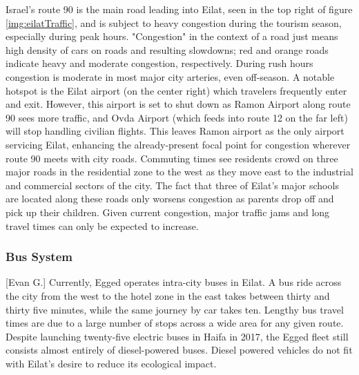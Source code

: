 \documentclass[12pt]{article}                       %
\begin{document}
Israel's route 90 is the main road leading into Eilat, seen in the top right of figure \ref{img:eilatTraffic}, and is subject to heavy congestion during the tourism season, especially during peak hours. "Congestion" in the context of a road just means high density of cars on roads and resulting slowdowns; red and orange roads indicate heavy and moderate congestion, respectively. During rush hours congestion is moderate in most major city arteries, even off-season. A notable hotspot is the Eilat airport (on the center right) which travelers frequently enter and exit. However, this airport is set to shut down as Ramon Airport along route 90 sees more traffic, and Ovda Airport (which feeds into route 12 on the far left) will stop handling civilian flights. This leaves Ramon airport as the only airport servicing Eilat, enhancing the already-present focal point for congestion wherever route 90 meets with city roads. Commuting times see residents crowd on three major roads in the residential zone to the west as they move east to the industrial and commercial sectors of the city. The fact that three of Eilat's major schools are located along these roads only worsens congestion as parents drop off and pick up their children. Given current congestion, major traffic jams and long travel times can only be expected to increase.

\subsubsection{Bus System}[Evan G.]
Currently, Egged operates intra-city buses in Eilat. A bus ride across the city from the west to the hotel zone in the east takes between thirty and thirty five minutes, while the same journey by car takes ten. Lengthy bus travel times are due to a large number of stops across a wide area for any given route. Despite launching twenty-five electric buses in Haifa in 2017, the Egged fleet still consists almost entirely of diesel-powered buses. Diesel powered vehicles do not fit with Eilat's desire to reduce its ecological impact.


\end{document}
